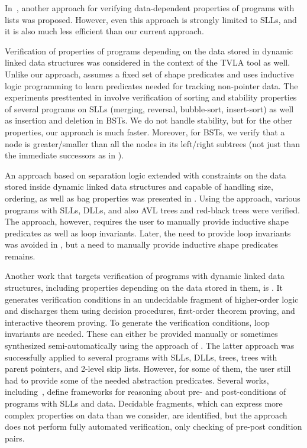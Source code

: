In~\cite{atva09}, another approach for verifying data-dependent properties of
programs with lists was proposed. However, even this approach is strongly
limited to SLLs, and it is also much less efficient than our current approach.


Verification of properties of programs depending on the data stored in dynamic
linked data structures was considered in the context of the TVLA tool
\cite{Loginov:AbstrRefViaInductLearning:05} as well. Unlike our approach,
\cite{Loginov:AbstrRefViaInductLearning:05} assumes a fixed set of shape
predicates and uses inductive logic programming to learn predicates needed for
tracking non-pointer data. The experiments presttented in
\cite{Loginov:AbstrRefViaInductLearning:05} involve verification of sorting and
stability properties of several programs on SLLs (merging, reversal,
bubble-sort, insert-sort) as well as insertion and deletion in BSTs. We do not
handle stability, but for the other properties, our approach is much faster.
Moreover, for BSTs, we verify that a node is greater/smaller than all the nodes
in its left/right subtrees (not just than the immediate successors as in
\cite{Loginov:AbstrRefViaInductLearning:05}).

An approach based on separation logic extended with constraints on the data
stored inside dynamic linked data structures and capable of handling size,
ordering, as well as bag properties was presented in \cite{rival11}. Using the
approach, various programs with SLLs, DLLs, and also AVL trees and red-black
trees were verified. The approach, however, requires the user to manually
provide inductive shape predicates as well as loop invariants.  Later, the need
to provide loop invariants was avoided in \cite{sleek13}, but a need to manually
provide inductive shape predicates remains.

Another work that targets verification of programs with dynamic linked data
structures, including properties depending on the data stored in them, is
\cite{Hongseok:SL}. It generates verification conditions in an undecidable
fragment of higher-order logic and discharges them using decision procedures,
first-order theorem proving, and interactive theorem proving. To generate the
verification conditions, loop invariants are needed. These can either be
provided manually or sometimes synthesized semi-automatically using the approach
of \cite{SagivRW02}. The latter approach was successfully applied to several
programs with SLLs, DLLs, trees, trees with parent pointers, and 2-level skip
lists. However, for some of them, the user still had to provide some of the
needed abstraction predicates.
Several works, including~\cite{dragoi:atva12}, define frameworks for reasoning
about pre- and post-conditions of programs with SLLs and data. Decidable
fragments, which can express more complex properties on data than we consider,
are identified, but the approach does not perform fully automated verification,
only checking of pre-post condition pairs.


